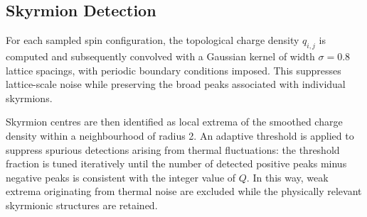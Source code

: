 \subsection{Skyrmion Detection}

For each sampled spin configuration, the topological charge density $q_{i,j}$ is computed and subsequently convolved with a Gaussian kernel of width $\sigma = 0.8$ lattice spacings, with periodic boundary conditions imposed. This suppresses lattice-scale noise while preserving the broad peaks associated with individual skyrmions.

Skyrmion centres are then identified as local extrema of the smoothed charge density within a neighbourhood of radius 2. An adaptive threshold is applied to suppress spurious detections arising from thermal fluctuations: the threshold fraction is tuned iteratively until the number of detected positive peaks minus negative peaks is consistent with the integer value of $Q$. In this way, weak extrema originating from thermal noise are excluded while the physically relevant skyrmionic structures are retained.
